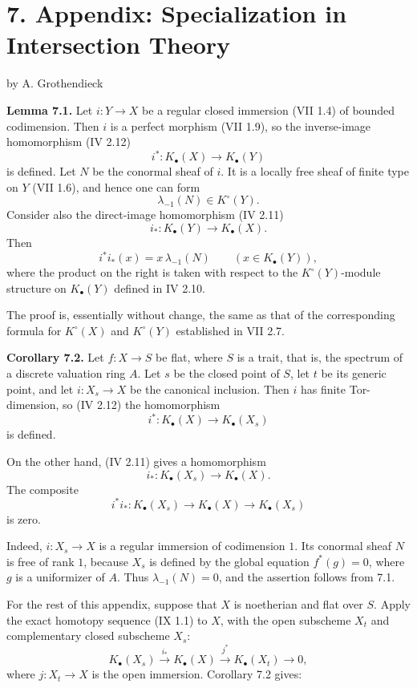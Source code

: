 \section*{7. Appendix: Specialization in Intersection Theory}
\begin{center}
by A. Grothendieck
\end{center}

\textbf{Lemma 7.1.}
Let $i:Y\to X$ be a regular closed immersion (VII 1.4) of bounded
codimension. Then $i$ is a perfect morphism (VII 1.9), so the inverse-image
homomorphism (IV 2.12)
\[
i^*:K_\bullet(X)\longrightarrow K_\bullet(Y)
\]
is defined. Let $N$ be the conormal sheaf of $i$. It is a locally free
sheaf of finite type on $Y$ (VII 1.6), and hence one can form
\[
\lambda_{-1}(N)\in K^\circ(Y).
\]
Consider also the direct-image homomorphism (IV 2.11)
\[
i_*:K_\bullet(Y)\longrightarrow K_\bullet(X).
\]
Then
\[
i^*i_*(x)=x\,\lambda_{-1}(N)\qquad(x\in K_\bullet(Y)),
\]
where the product on the right is taken with respect to the
$K^\circ(Y)$-module structure on $K_\bullet(Y)$ defined in IV 2.10.

The proof is, essentially without change, the same as that of the
corresponding formula for $K^\circ(X)$ and $K^\circ(Y)$ established in
VII 2.7.

\textbf{Corollary 7.2.}
Let $f:X\to S$ be flat, where $S$ is a trait, that is, the spectrum of a
discrete valuation ring $A$. Let $s$ be the closed point of $S$, let $t$ be
its generic point, and let $i:X_s\to X$ be the canonical inclusion. Then
$i$ has finite Tor-dimension, so (IV 2.12) the homomorphism
\[
i^*:K_\bullet(X)\longrightarrow K_\bullet(X_s)
\]
is defined.

On the other hand, (IV 2.11) gives a homomorphism
\[
i_*:K_\bullet(X_s)\longrightarrow K_\bullet(X).
\]
The composite
\[
i^*i_*:K_\bullet(X_s)\longrightarrow K_\bullet(X)
\longrightarrow K_\bullet(X_s)
\]
is zero.

Indeed, $i:X_s\to X$ is a regular immersion of codimension $1$. Its
conormal sheaf $N$ is free of rank $1$, because $X_s$ is defined by the
global equation $f^*(g)=0$, where $g$ is a uniformizer of $A$. Thus
$\lambda_{-1}(N)=0$, and the assertion follows from 7.1.

For the rest of this appendix, suppose that $X$ is noetherian and flat over
$S$. Apply the exact homotopy sequence (IX 1.1) to $X$, with the open
subscheme $X_t$ and complementary closed subscheme $X_s$:
\[
K_\bullet(X_s)\xrightarrow{i_*}K_\bullet(X)
\xrightarrow{j^*}K_\bullet(X_t)\longrightarrow0,
\]
where $j:X_t\to X$ is the open immersion. Corollary 7.2 gives:

